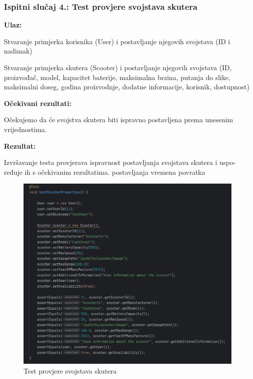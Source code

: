 			\subsubsection{Ispitni slučaj 4.: Test provjere svojstava skutera}

					\noindent\textbf{Ulaz:}
					\begin{packed_item}
						\item Stvaranje primjerka korisnika (User) i postavljanje njegovih svojstava (ID i nadimak)
						\item Stvaranje primjerka skutera (Scooter) i postavljanje njegovih svojstava (ID, proizvođač, model, kapacitet baterije, maksimalna brzina, putanja do slike, maksimalni doseg, godina proizvodnje, dodatne informacije, korisnik, dostupnost)
					\end{packed_item}
					
					\noindent\textbf{Očekivani rezultati:}
					\begin{packed_item}
						\item Očekujemo da će svojstva skutera biti ispravno postavljena prema unesenim vrijednostima.
					\end{packed_item}
					\noindent\textbf{Rezultat:}
					\begin{packed_item}
						\item  Izvršavanje testa provjerava ispravnost postavljanja svojstava skutera i uspo- ređuje ih s očekivanim rezultatima.
						 postavljanja vremena povratka
					\end{packed_item}
              \begin{figure} [H]
              	\centering
              	\includegraphics[width=0.7\linewidth]{slike/ScooterTest.png}
              	\caption{Test provjere svojstava skutera}
              	\label{fig:Test provjere svojstava skutera}
              \end{figure}

